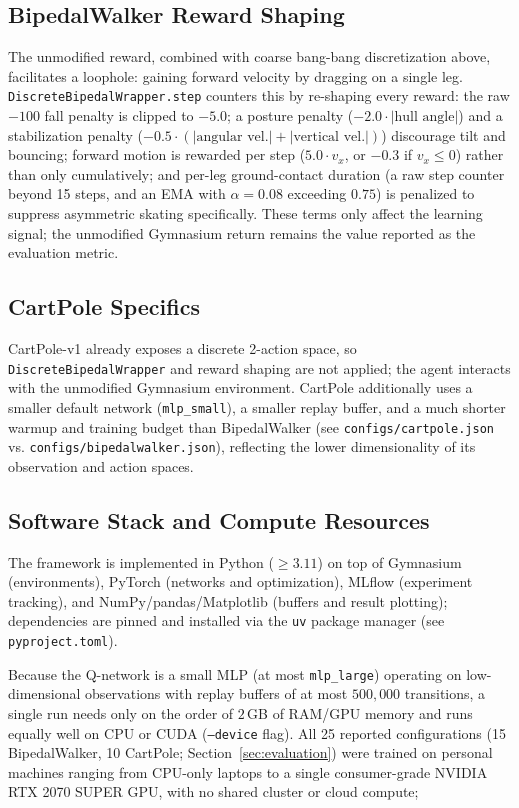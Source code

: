 \subsection{BipedalWalker Reward Shaping}

The unmodified reward, combined with coarse bang-bang discretization above, facilitates a loophole: gaining forward velocity by dragging on a single leg. \texttt{DiscreteBipedalWrapper.step} counters this by re-shaping every reward: the raw $-100$ fall penalty is clipped to $-5.0$; a posture penalty ($-2.0 \cdot |\text{hull angle}|$) and a stabilization penalty ($-0.5 \cdot (|\text{angular vel.}| + |\text{vertical vel.}|)$) discourage tilt and bouncing; forward motion is rewarded per step ($5.0 \cdot v_x$, or $-0.3$ if $v_x \le 0$) rather than only cumulatively; and per-leg ground-contact duration (a raw step counter beyond 15 steps, and an EMA with $\alpha = 0.08$ exceeding $0.75$) is penalized to suppress asymmetric skating specifically. These terms only affect the learning signal; the unmodified Gymnasium return remains the value reported as the evaluation metric.

\subsection{CartPole Specifics}
CartPole-v1 already exposes a discrete 2-action space, so \texttt{DiscreteBipedalWrapper} and reward shaping are not applied; the agent interacts with the unmodified Gymnasium environment. CartPole additionally uses a smaller default network (\texttt{mlp\_small}), a smaller replay buffer, and a much shorter warmup and training budget than BipedalWalker (see \texttt{configs/cartpole.json} vs. \texttt{configs/bipedalwalker.json}), reflecting the lower dimensionality of its observation and action spaces.

\subsection{Software Stack and Compute Resources}
\label{sec:compute}
The framework is implemented in Python ($\geq 3.11$) on top of Gymnasium (environments), PyTorch (networks and optimization), MLflow (experiment tracking), and NumPy/pandas/Matplotlib (buffers and result plotting); dependencies are pinned and installed via the \texttt{uv} package manager (see \texttt{pyproject.toml}).

Because the Q-network is a small MLP (at most \texttt{mlp\_large}) operating on low-dimensional observations with replay buffers of at most $500{,}000$ transitions, a single run needs only on the order of $2$\,GB of RAM/GPU memory and runs equally well on CPU or CUDA (\texttt{--device} flag). All 25 reported configurations (15 BipedalWalker, 10 CartPole; Section~\ref{sec:evaluation}) were trained on personal machines ranging from CPU-only laptops to a single consumer-grade NVIDIA RTX 2070 SUPER GPU, with no shared cluster or cloud compute;

